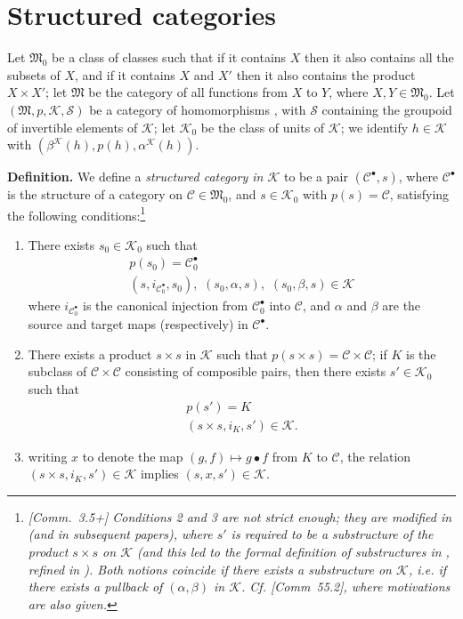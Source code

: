 \documentclass{article}
\newenvironment{rmenv}[1]
  {\phantomsection\par\medskip\noindent\textbf{#1.}\rmfamily}
  {\par\medskip}
\newcommand{\CC}{\mathcal{C}}
\newcommand{\MM}{\mathfrak{M}}
\newcommand{\KK}{\mathcal{K}}
\renewcommand{\SS}{\mathcal{S}}
\begin{document}
\section{Structured categories}

Let $\MM_0$ be a class of classes such that if it contains $X$ then it also contains all the subsets of $X$, and if it contains $X$ and $X'$ then it also contains the product $X\times X'$;
let $\MM$ be the category of all functions from $X$ to $Y$, where $X,Y\in\MM_0$.
Let $(\MM,p,\KK,\SS)$ be a category of homomorphisms \cite{47b,55}, with $\SS$ containing the groupoid of invertible elements of $\KK$;
let $\KK_0$ be the class of units of $\KK$;
we identify $h\in\KK$ with $(\beta^\KK(h),p(h),\alpha^\KK(h))$.

\begin{rmenv}{Definition}
  We define a \emph{structured category in $\KK$} to be a pair $(\CC^\bullet,s)$, where $\CC^\bullet$ is the structure of a category on $\CC\in\MM_0$, and $s\in\KK_0$ with $p(s)=\CC$, satisfying the following conditions:\footnote{\emph{[Comm.~3.5+] Conditions 2 and 3 are not strict enough; they are modified in \cite{63} (and in subsequent papers), where $s'$ is required to be a substructure of the product $s\times s$ on $\KK$ (and this led to the formal definition of substructures in \cite{63}, refined in \cite{69,66}). Both notions coincide if there exists a substructure on $\KK$, i.e. if there exists a pullback of $(\alpha,\beta)$ in $\KK$. Cf. [Comm~55.2], where motivations are also given.}}
  \begin{enumerate}
    \item There exists $s_0\in\KK_0$ such that
      \[
        \begin{gathered}
          p(s_0)
          = \CC_0^\bullet
        \\(s,i_{\CC_0^\bullet},s_0),\,\,
          (s_0,\alpha,s),\,\,
          (s_0,\beta,s)
          \in\KK
        \end{gathered}
      \]
      where $i_{\CC_0^\bullet}$ is the canonical injection from $\CC_0^\bullet$ into $\CC$, and $\alpha$ and $\beta$ are the source and target maps (respectively) in $\CC^\bullet$.
    \item There exists a product $s\times s$ in $\KK$ such that $p(s\times s)=\CC\times\CC$;
      if $K$ is the subclass of $\CC\times\CC$ consisting of composible pairs, then there exists $s'\in\KK_0$ such that
      \[
        \begin{gathered}
          p(s')=K
        \\(s\times s,i_K,s')\in\KK.
        \end{gathered}
      \]
    \item writing $x$ to denote the map $(g,f)\mapsto g\bullet f$ from $K$ to $\CC$, the relation $(s\times s,i_K,s')\in\KK$ implies $(s,x,s')\in\KK$.
  \end{enumerate}
\end{rmenv}
\end{document}
